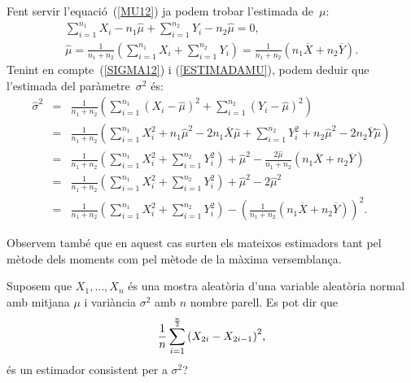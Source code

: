 {\begin{itemize}
\begin{itemize}
	Fent servir l'equaci\'o~(\ref{MU12}) ja podem trobar l'estimada de~$\mu$:
	\begin{equation}
	\begin{array}{c}
	\sum\limits_{i=1}^{n_1} X_i -n_1\hat{\mu} +\sum\limits_{i=1}^{n_2} Y_i -n_2 \hat{\mu} 
	=  0, \\
	\hat{\mu} = \frac{1}{n_1+n_2}\left(\sum\limits_{i=1}^{n_1} X_i 
	+\sum\limits_{i=1}^{n_2} Y_i\right)=\frac{1}{n_1+n_2} \left( 
	n_1\overline{X}+n_2\overline{Y}\right).
	\end{array}
	\label{ESTIMADAMU}
    \end{equation}
    Tenint en compte~(\ref{SIGMA12}) i (\ref{ESTIMADAMU}), 
    podem deduir que l'estimada del par\`ametre~$\sigma^2$ \'es:
    \begin{eqnarray*}
    \hat{\sigma}^2 & = & \frac{1}{n_1 + n_2}\left(\sum_{i=1}^{n_1} {(X_i 
    -\hat{\mu})}^2 + \sum_{i=1}^{n_2} {(Y_i -\hat{\mu})}^2\right) \\
    & = & \frac{1}{n_1 + n_2} \left(\sum_{i=1}^{n_1} X_i^2 + n_1 
    {\hat{\mu}}^2 - 2 n_1 \overline{X} \hat{\mu} +\sum_{i=1}^{n_2} Y_i^2 
    + n_2 {\hat{\mu}}^2 - 2 n_2 \overline{Y} \hat{\mu}\right) \\
    &= & \frac{1}{n_1 + n_2}\left(\sum_{i=1}^{n_1} X_i^2 + 
    \sum_{i=1}^{n_2} Y_i^2 \right) + {\hat{\mu}}^2 -\frac{2\hat{\mu}}{n_1 
    + n_2} \left( n_1 \overline{X} + n_2 \overline{Y}\right) \\
    & = & \frac{1}{n_1 + n_2}\left(\sum_{i=1}^{n_1} X_i^2 + 
    \sum_{i=1}^{n_2} Y_i^2 \right) + {\hat{\mu}}^2 - 2 {\hat{\mu}}^2 \\
     & = & \frac{1}{n_1 + n_2}\left(\sum_{i=1}^{n_1} X_i^2 + 
    \sum_{i=1}^{n_2} Y_i^2 \right) - {\left(\frac{1}{n_1+n_2} \left( 
	n_1\overline{X}+n_2\overline{Y}\right)\right)}^2.
    \end{eqnarray*}
\end{itemize}
\end{itemize}
Observem tamb\'e que en aquest cas surten els mateixos estimadors tant pel m\`etode dels 
moments com pel m\`etode de la m\`axima versemblan\c{c}a.}

\begin{probres}
{Suposem que $X_1,\ldots,X_n$ \'es una mostra aleat\`oria d'una variable
aleat\`oria normal amb mitjana $\mu$ i vari\`ancia $\sigma^2$ amb $n$ nombre
parell. Es pot dir que $${1\over n} \sum_{i=1}^{{n\over
2}}{(X_{2i}-X_{2i-1})}^2,$$\'es un estimador consistent per a $\sigma^2$?}
\end{probres}

